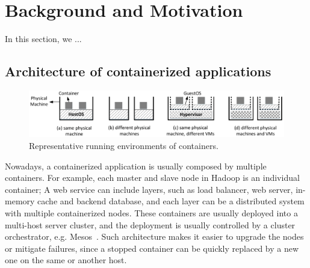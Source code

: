 \section{Background and Motivation}
\label{sec:motivation}

In this section, we ...

\subsection{Architecture of containerized applications}

\begin{figure}[h]  
	\centering   
	\includegraphics[width=6.7in]{figures/deployment-cases}   
	\caption{\label{fig:deploy-cases} Representative running environments of containers.}   
\end{figure}


Nowadays, a containerized application is usually composed by multiple containers. For example, each master and slave node in Hadoop is an individual container; A web service can include layers, such as load balancer, web server,
in-memory cache and backend database, and each layer can be a distributed 
system with multiple containerized nodes. 
These containers are usually 
deployed into a multi-host server cluster, and the deployment is usually 
controlled by a cluster orchestrator, e.g. Mesos~\cite{?}. 
Such architecture makes it easier
to upgrade the nodes or mitigate failures, since a stopped container can be quickly replaced by a new one on the same or another host.

